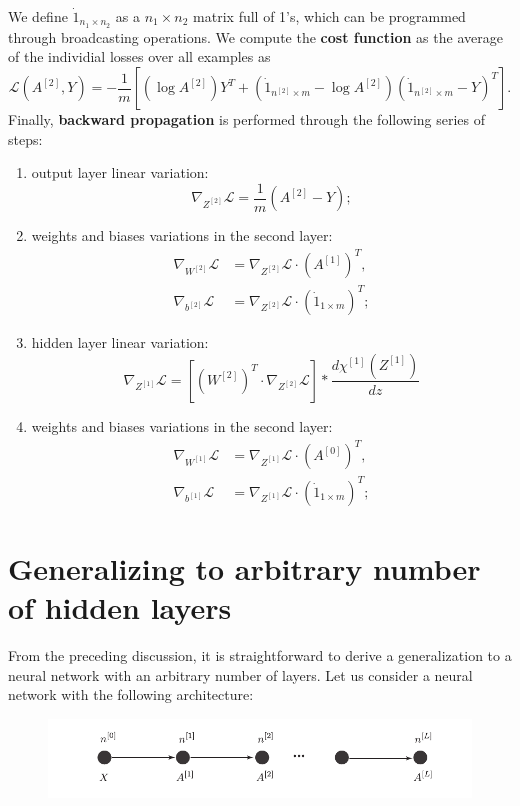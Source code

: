 \documentclass[aps,10pt]{revtex4}
\theoremstyle{plain}
\theoremstyle{definition}
\theoremstyle{remark}
\begin{document}
We define $\dot{1}_{n_1\times n_2}$  as a $n_1\times n_2$ matrix full of 1's, which can be programmed through broadcasting operations. We compute the \textbf{cost function} as the average of the individial losses over all examples as
\begin{equation}
 \mathcal{L}\left(A^{[2]},Y\right) = -\frac{1}{m}\left[\left(\log A^{[2]}\right) Y^T + \left(\dot{1}_{n^{[2]}\times m}-\log A^{[2]}\right) \left(\dot{1}_{n^{[2]}\times m} - Y\right)^T\right].
\end{equation}
Finally, \textbf{backward propagation} is performed through the following series of steps:
\begin{enumerate}
	\item output layer linear variation:
	\begin{equation}
	 \nabla_{Z^{[2]}} \mathcal{L} = \frac{1}{m}\left(A^{[2]} - Y\right);
	\end{equation}
	\item weights and biases variations in the second layer:
	\begin{eqnarray}
	 \nabla_{W^{[2]}}\mathcal{L} & = \nabla_{Z^{[2]}} \mathcal{L} \cdot \left(A^{[1]}\right)^T, \\
	 \nabla_{b^{[2]}}\mathcal{L} & = \nabla_{Z^{[2]}} \mathcal{L} \cdot \left(\dot{1}_{1\times m}\right)^T;
	\end{eqnarray}
	\item hidden layer linear variation:
	\begin{equation}
	\nabla_{Z^{[1]}} \mathcal{L} = \left[\left(W^{[2]}\right)^T\cdot\nabla_{Z^{[2]}} \mathcal{L}\right]*\frac{d\chi^{[1]}(Z^{[1]})}{dz}
	\end{equation}
	\item weights and biases variations in the second layer:
	\begin{eqnarray}
	\nabla_{W^{[1]}}\mathcal{L} & = \nabla_{Z^{[1]}} \mathcal{L} \cdot \left(A^{[0]}\right)^T, \\
	\nabla_{b^{[1]}}\mathcal{L} & = \nabla_{Z^{[1]}} \mathcal{L} \cdot \left(\dot{1}_{1\times m}\right)^T;
	\end{eqnarray}
\end{enumerate}

\section{Generalizing to arbitrary number of hidden layers}
\noindent From the preceding discussion, it is straightforward to derive a generalization to a neural network with an arbitrary number of layers. Let us consider a neural network with the following architecture:
\begin{figure}[h]
	\centering
	\includegraphics[width=0.9\linewidth]{deep_network_architecture}
	\caption{}
	\label{fig:deepnetworkarchitecture}
\end{figure}
\end{document}
